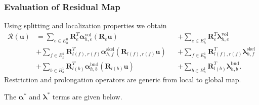 \begin{frame}
\frametitle<presentation>{Evaluation of Residual Map}
Using splitting and localization properties we obtain
\begin{align*}
\mathcal{R}(\mathbf{u})
&= \sum_{e\in E^0_h} \mathbf{R}_e^T\bm{\alpha}^\text{vol}_{h,e}(\mathbf{R}_e\mathbf{u})
&&+ \sum_{e\in E^0_h} \mathbf{R}_e^T\bm{\lambda}^\text{vol}_{h,e} \\
&+ \sum_{f\in E^1_h}
\mathbf{R}_{l(f),r(f)}^T\bm{\alpha}^\text{skel}_{h,f}(\mathbf{R}_{l(f),r(f)}\mathbf{u})
&&+ \sum_{f\in E^1_h} \mathbf{R}_{l(f),r(f)}^T\bm{\lambda}^\text{skel}_{h,f}\\
&+ \sum_{b\in B^1_h} \mathbf{R}_{l(b)}^T\bm{\alpha}^\text{bnd}_{h,b}(\mathbf{R}_{l(b)}\mathbf{u})
&&+ \sum_{b\in B^1_h} \mathbf{R}_{l(b)}^T\bm{\lambda}^\text{bnd}_{h,b}.
\end{align*}
Restriction and prolongation operators are generic from local to global map.
\end{frame}

The $\bm{\alpha}^\ast$ and $\bm{\lambda}^\ast$ terms are given below.

